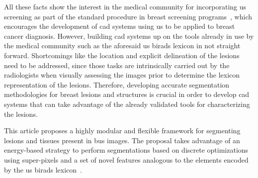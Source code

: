 All these facts show the interest in the medical community for incorporating \ac{us} screening as part of the standard procedure in breast screening programs~\cite{biradsus}, which encourages the development of \ac{cad} systems using \ac{us} to be applied to breast cancer diagnosis.
However, building \ac{cad} systems up on the tools already in use by the medical community such as the aforesaid \ac{us} \ac{birads} lexicon in not straight forward.
Shortcomings like the location and explicit delineation of the lesions need to be addressed, since those tasks are intrinsically carried out by the radiologists when visually assessing the images prior to determine the lexicon representation of the lesions.
Therefore, developing accurate segmentation methodologies for breast lesions and structures is crucial in order to develop \ac{cad} systems that can take advantage of the already validated tools for characterizing the lesions.

%

This article proposes a highly modular and flexible framework for segmenting lesions and tissues present in \ac{bus} images.
The proposal takes advantage of an energy-based strategy to perform segmentations based on discrete optimizations using super-pixels and a set of novel features analogous to the elements encoded by the \ac{us} \ac{birads} lexicon~\cite{biradsus}.

